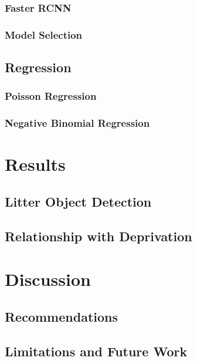\documentclass{thesis}
\begin{document}
\subsection{Faster RCNN}
\subsection{Model Selection}

\section{Regression}
\subsection{Poisson Regression}
\subsection{Negative Binomial Regression}


\chapter{Results}

\section{Litter Object Detection}
\section{Relationship with Deprivation}


\chapter{Discussion}

\section{Recommendations}
\section{Limitations and Future Work}
\end{document}
